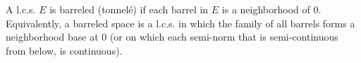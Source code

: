 A l.c.s. $E$ is barreled (tonnel\'e) if each barrel in $E$ is a neighborhood of 0. Equivalently, a barreled space is a l.c.s. in which the family of all barrels forms a neighborhood base at 0 (or on which each semi-norm that is semi-continuous from below, is continuous).
